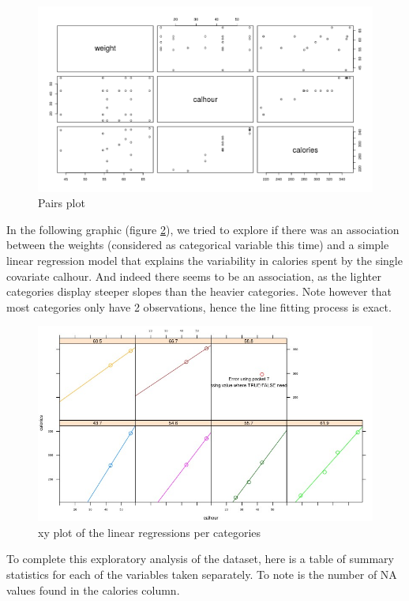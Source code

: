 \documentclass[11pt, a4paper]{article}
\begin{document}
\begin{figure}[H]
    \centering
    \includegraphics[scale=.55]{pairsplot.png}
    \caption{Pairs plot}
    \label{fig:pairs}
\end{figure}


In the following graphic (figure \ref{fig:xyplot}), we tried to
explore if there was an association between the weights (considered as
categorical variable this time) and a simple linear regression model
that explains the variability in calories spent by the single
covariate calhour. And indeed there seems to be an association, as the
lighter categories display steeper slopes than the heavier
categories. Note however that most categories only have 2
observations, hence the line fitting process is exact.

\begin{figure}[H]
    \centering
    \includegraphics[scale=.6]{incomplete.jpg}
    \caption{xy plot of the linear regressions per categories}
    \label{fig:xyplot}
\end{figure}

To complete this exploratory analysis of the dataset, here is a table
of summary statistics for each of the variables taken separately. To
note is the number of NA values found in the calories column.
\end{document}

